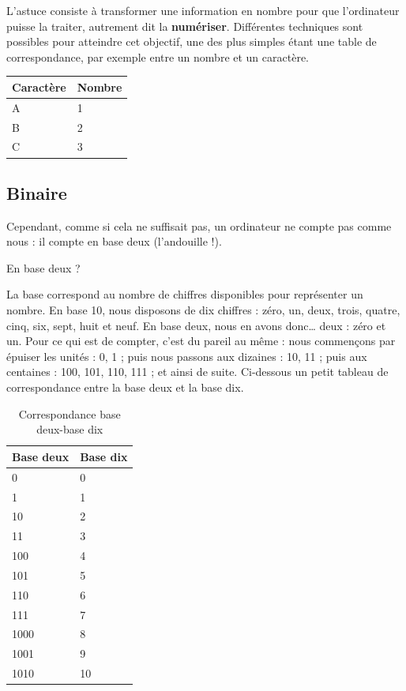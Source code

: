 L'astuce consiste à transformer une information en nombre pour que
l'ordinateur puisse la traiter, autrement dit la \textbf{numériser}.
Différentes techniques sont possibles pour atteindre cet objectif, une
des plus simples étant une table de correspondance, par exemple entre
un nombre et un caractère.

\begin{table}[ht!]
\centering
\begin{tabular}{|l|l|}\hline
\rowcolor{gris-tab-entete}Caractère & Nombre \\ \hline
\rowcolor{gris-clair-tab}A	  & 1      \\ \hline 
B	  & 2      \\ \hline
\rowcolor{gris-clair-tab}C  	  & 3      \\ \hline
\end{tabular}
\end{table}

\subsection{Binaire}\label{binaire}

Cependant, comme si cela ne suffisait pas, un ordinateur ne compte pas
comme nous : il compte en base deux (l'andouille !).

\begin{questionbox}
En base deux ?
\end{questionbox}

La base correspond au nombre de chiffres disponibles pour représenter
un nombre. En base 10, nous disposons de dix chiffres : zéro, un,
deux, trois, quatre, cinq, six, sept, huit et neuf. En base deux, nous
en avons donc\ldots{} deux : zéro et un. Pour ce qui est de compter,
c'est du pareil au même : nous commençons par épuiser les unités : 0,
1 ; puis nous passons aux dizaines : 10, 11 ; puis aux centaines :
100, 101, 110, 111 ; et ainsi de suite. Ci-dessous un petit tableau de
correspondance entre la base deux et la base dix.

\begin{table}[ht!]
\centering
\begin{tabular}{|l|l|}\hline
\rowcolor{gris-tab-entete}\textbf{Base deux} & \textbf{Base dix}\tabularnewline\hline
\rowcolor{gris-clair-tab}0 & 0\tabularnewline\hline
1 & 1\tabularnewline\hline
\rowcolor{gris-clair-tab}10 & 2\tabularnewline\hline
11 & 3\tabularnewline\hline
\rowcolor{gris-clair-tab}100 & 4\tabularnewline\hline
101 & 5\tabularnewline\hline
\rowcolor{gris-clair-tab}110 & 6\tabularnewline\hline
111 & 7\tabularnewline\hline
\rowcolor{gris-clair-tab}1000 & 8\tabularnewline\hline
1001 & 9\tabularnewline\hline
\rowcolor{gris-clair-tab}1010 & 10\tabularnewline\hline
\end{tabular}
\caption{Correspondance base deux-base dix}
\end{table}

